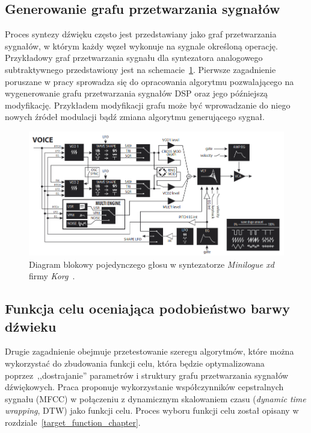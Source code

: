 \subsection{Generowanie grafu przetwarzania sygnałów}

Proces syntezy dźwięku często jest przedstawiany jako graf przetwarzania sygnałów, w którym
każdy węzeł wykonuje na sygnale określoną operację.
Przykładowy graf przetwarzania sygnału dla syntezatora analogowego subtraktywnego
przedstawiony jest na schemacie~\ref{fig:minilogue_diagram}.
Pierwsze zagadnienie poruszane w pracy sprowadza się do opracowania algorytmu pozwalającego na wygenerowanie
grafu przetwarzania sygnałów DSP oraz jego późniejszą modyfikację. Przykładem modyfikacji grafu
może być wprowadzanie do niego nowych źródeł modulacji bądź zmiana algorytmu generującego sygnał.

\begin{figure}[H]
    \centering
    \includegraphics[width=0.8\linewidth]{rys01/minilogue_voice_block_diagram.png}
    \caption{
      Diagram blokowy pojedynczego głosu w syntezatorze 
      \textit{Minilogue xd} firmy \textit{Korg}~\cite{minilogue_diagram}.
    }\label{fig:minilogue_diagram}
\end{figure}

\subsection{Funkcja celu oceniająca podobieństwo barwy dźwieku}

Drugie zagadnienie obejmuje przetestowanie szeregu algorytmów, które można
wykorzystać do zbudowania funkcji celu, która będzie optymalizowana
poprzez~,,dostrajanie'' parametrów i struktury grafu przetwarzania sygnałów dźwiękowych.
Praca proponuje wykorzystanie współczynników cepstralnych sygnału (MFCC) w połączeniu
z dynamicznym skalowaniem czasu (\textit{dynamic time wrapping}, DTW) jako funkcji celu.
Proces wyboru funkcji celu został
opisany w rozdziale~\ref{target_function_chapter}.


